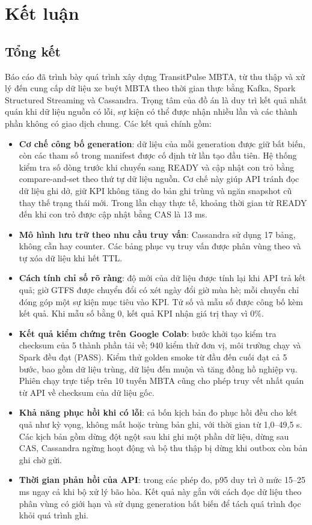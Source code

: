 \section{Kết luận}
\label{sec:conclusion}

\subsection{Tổng kết}

Báo cáo đã trình bày quá trình xây dựng TransitPulse MBTA, từ thu thập và xử lý đến cung cấp dữ liệu xe buýt MBTA theo thời gian thực bằng Kafka, Spark Structured Streaming và Cassandra. Trọng tâm của đồ án là duy trì kết quả nhất quán khi dữ liệu nguồn có lỗi, sự kiện có thể được nhận nhiều lần và các thành phần không có giao dịch chung. Các kết quả chính gồm:

\begin{itemize}
    \item \textbf{Cơ chế công bố generation}: dữ liệu của mỗi generation được giữ bất biến, còn các tham số trong manifest được cố định từ lần tạo đầu tiên. Hệ thống kiểm tra số dòng trước khi chuyển sang READY và cập nhật con trỏ bằng compare-and-set theo thứ tự dữ liệu nguồn. Cơ chế này giúp API tránh đọc dữ liệu ghi dở, giữ KPI không tăng do bản ghi trùng và ngăn snapshot cũ thay thế trạng thái mới. Trong lần chạy thực tế, khoảng thời gian từ READY đến khi con trỏ được cập nhật bằng CAS là 13 ms.
    \item \textbf{Mô hình lưu trữ theo nhu cầu truy vấn}: Cassandra sử dụng 17 bảng, không cần  hay counter. Các bảng phục vụ truy vấn được phân vùng theo  và tự xóa dữ liệu khi hết TTL.
    \item \textbf{Cách tính chỉ số rõ ràng}: độ mới của dữ liệu được tính lại khi API trả kết quả; giờ GTFS được chuyển đổi có xét ngày đổi giờ mùa hè; mỗi chuyến chỉ đóng góp một sự kiện mục tiêu vào KPI. Tử số và mẫu số được công bố kèm kết quả. Khi mẫu số bằng 0, kết quả KPI nhận giá trị  thay vì 0\%.
    \item \textbf{Kết quả kiểm chứng trên Google Colab}: bước khởi tạo kiểm tra checksum của 5 thành phần tải về; 940 kiểm thử đơn vị, môi trường chạy và Spark đều đạt (PASS). Kiểm thử golden smoke từ đầu đến cuối đạt cả 5 bước, bao gồm dữ liệu trùng, dữ liệu đến muộn và tăng đồng hồ nghiệp vụ. Phiên chạy trực tiếp trên 10 tuyến MBTA cũng cho phép truy vết nhất quán từ API về checksum của dữ liệu gốc.
    \item \textbf{Khả năng phục hồi khi có lỗi}: cả bốn kịch bản đo phục hồi đều cho kết quả như kỳ vọng, không mất hoặc trùng bản ghi, với thời gian từ 1,0--49,5 s. Các kịch bản gồm dừng đột ngột sau khi ghi một phần dữ liệu, dừng sau CAS, Cassandra ngừng hoạt động và bộ thu thập bị dừng khi outbox còn bản ghi chờ gửi.
    \item \textbf{Thời gian phản hồi của API}: trong các phép đo, p95 duy trì ở mức 15--25 ms ngay cả khi bộ xử lý bão hòa. Kết quả này gắn với cách đọc dữ liệu theo phân vùng có giới hạn và sử dụng generation bất biến để tách quá trình đọc khỏi quá trình ghi.
\end{itemize}

